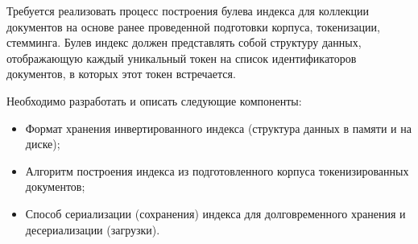 
Требуется реализовать процесс построения булева индекса для коллекции документов на основе ранее проведенной подготовки корпуса, токенизации, стемминга. Булев индекс должен представлять собой структуру данных, отображающую каждый уникальный токен на список идентификаторов документов, в которых этот токен встречается.

Необходимо разработать и описать следующие компоненты:

\begin{itemize}
    \item Формат хранения инвертированного индекса (структура данных в памяти и на диске);
    \item Алгоритм построения индекса из подготовленного корпуса токенизированных документов;
    \item Способ сериализации (сохранения) индекса для долговременного хранения и десериализации (загрузки).
\end{itemize}

\pagebreak
